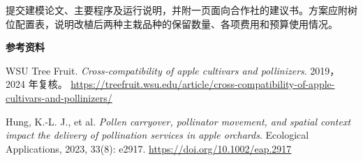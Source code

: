 \documentclass[11pt,a4paper]{article}
\begin{document}
提交建模论文、主要程序及运行说明，并附一页面向合作社的建议书。方案应附树位配置表，说明改植后两种主栽品种的保留数量、各项费用和预算使用情况。

\vspace{4pt}
\noindent\textbf{参考资料}
\begin{enumerate}[label={[\arabic*]},leftmargin=2em,itemsep=3pt]
\small
\item WSU Tree Fruit. \emph{Cross-compatibility of apple cultivars and pollinizers}. 2019，2024 年复核。\newline
\url{https://treefruit.wsu.edu/article/cross-compatibility-of-apple-cultivars-and-pollinizers/}
\item Hung, K.-L. J., et al. \emph{Pollen carryover, pollinator movement, and spatial context impact the delivery of pollination services in apple orchards}. Ecological Applications, 2023, 33(8): e2917.\newline
\url{https://doi.org/10.1002/eap.2917}
\end{enumerate}
\end{document}
